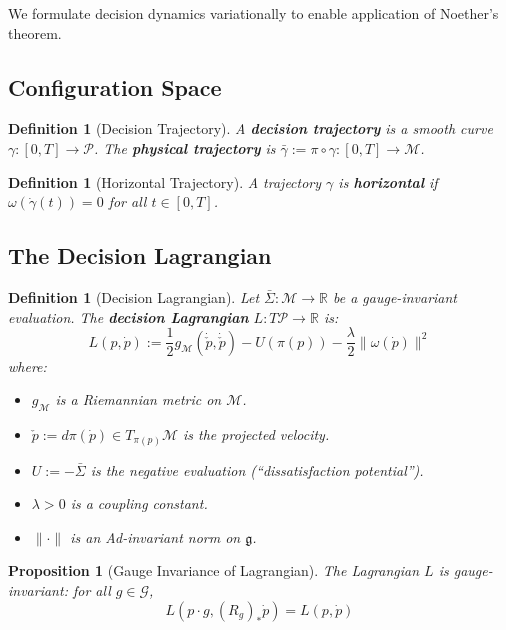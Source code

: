 \documentclass[11pt]{article}
\newtheorem{proposition}[theorem]{Proposition}
\newtheorem{definition}[theorem]{Definition}
\begin{document}
We formulate decision dynamics variationally to enable application of Noether's theorem.

\subsection{Configuration Space}

\begin{definition}[Decision Trajectory]
A \textbf{decision trajectory} is a smooth curve $\gamma : [0, T] \to \mathcal{P}$.
The \textbf{physical trajectory} is $\bar{\gamma} := \pi \circ \gamma : [0, T] \to \mathcal{M}$.
\end{definition}

\begin{definition}[Horizontal Trajectory]
A trajectory $\gamma$ is \textbf{horizontal} if $\omega(\dot{\gamma}(t)) = 0$ for all
$t \in [0, T]$.
\end{definition}

\subsection{The Decision Lagrangian}

\begin{definition}[Decision Lagrangian]
Let $\bar{\Sigma} : \mathcal{M} \to \mathbb{R}$ be a gauge-invariant evaluation. The
\textbf{decision Lagrangian} $L : T\mathcal{P} \to \mathbb{R}$ is:
\begin{equation}
L(p, \dot{p}) := \frac{1}{2} g_{\mathcal{M}}(\dot{\check{p}}, \dot{\check{p}}) - U(\pi(p)) - \frac{\lambda}{2} \|\omega(\dot{p})\|^2
\label{eq:lagrangian}
\end{equation}
where:
\begin{itemize}
    \item $g_{\mathcal{M}}$ is a Riemannian metric on $\mathcal{M}$.
    \item $\check{p} := d\pi(\dot{p}) \in T_{\pi(p)}\mathcal{M}$ is the projected velocity.
    \item $U := -\bar{\Sigma}$ is the negative evaluation (``dissatisfaction potential'').
    \item $\lambda > 0$ is a coupling constant.
    \item $\|\cdot\|$ is an Ad-invariant norm on $\mathfrak{g}$.
\end{itemize}
\end{definition}

\begin{proposition}[Gauge Invariance of Lagrangian]
The Lagrangian $L$ is gauge-invariant: for
all $g \in \mathcal{G}$,
\[
L(p \cdot g, (R_g)_* \dot{p}) = L(p, \dot{p})
\]
\end{proposition}
\end{document}

